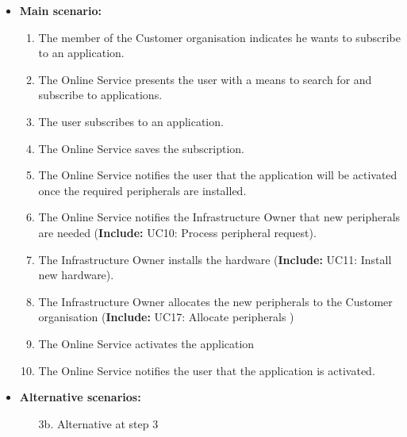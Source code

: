 \documentclass[english]{sareport}
\begin{document}
\begin{itemize}
        
    \item \textbf{Main scenario:} 
    \begin{enumerate}
       \item The member of the Customer organisation indicates he wants to subscribe to an application.
       \item The Online Service presents the user with a means to search for and subscribe to applications.
       \item The user subscribes to an application.
	\item The Online Service saves the subscription.
	\item The Online Service notifies the user that the application will be activated once the required peripherals are installed.
	\item The Online Service notifies the Infrastructure Owner that new peripherals are needed (\textbf{Include:} UC10: Process peripheral request).
	\item The Infrastructure Owner installs the hardware (\textbf{Include:} UC11: Install new hardware).
    \item The Infrastructure Owner allocates the new peripherals to the Customer organisation (\textbf{Include:} UC17: Allocate peripherals )
	\item The Online Service activates the application
	\item The Online Service notifies the user that the application is activated.
    \end{enumerate}

    \item \textbf{Alternative scenarios:} 
    \begin{enumerate}
        \item [3b.] Alternative at step 3
    \end{enumerate}
\end{itemize}
\end{document}
